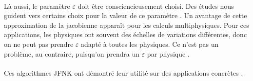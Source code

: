     \paragraph{}
    Là aussi, le paramètre $\varepsilon$ doit être consciencieusement choisi.
    Des études nous guident vers certains choix pour la valeur de ce paramètre \cite{KnollKeyes2004}.
    Un avantage de cette approximation de la jacobienne apparaît pour les calculs multiphysiques.
    Pour ces applications, les physiques ont souvent des échelles de variations différentes, donc on ne peut pas prendre $\varepsilon$ adapté à toutes les physiques.
    Ce n'est pas un problème, au contraire, puisqu'on prendra un $\varepsilon$ par physique \cite{Turpault2003}.

    \paragraph{}
    Ces algorithmes JFNK ont démontré leur utilité sur des applications concrètes \cite{LiuZhangZhongEtAl2015, FrancoCamierAndrejEtAl2020}.
